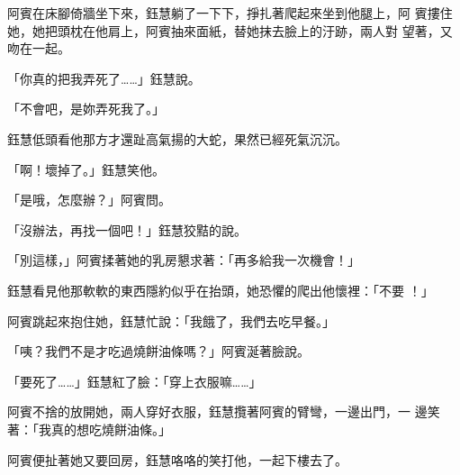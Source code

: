 阿賓在床腳倚牆坐下來，鈺慧躺了一下下，掙扎著爬起來坐到他腿上，阿
賓摟住她，她把頭枕在他肩上，阿賓抽來面紙，替她抹去臉上的汙跡，兩人對
望著，又吻在一起。

「你真的把我弄死了……」鈺慧說。

「不會吧，是妳弄死我了。」

鈺慧低頭看他那方才還趾高氣揚的大蛇，果然已經死氣沉沉。

「啊！壞掉了。」鈺慧笑他。

「是哦，怎麼辦？」阿賓問。

「沒辦法，再找一個吧！」鈺慧狡黠的說。

「別這樣，」阿賓揉著她的乳房懇求著：「再多給我一次機會！」

鈺慧看見他那軟軟的東西隱約似乎在抬頭，她恐懼的爬出他懷裡：「不要
！」

阿賓跳起來抱住她，鈺慧忙說：「我餓了，我們去吃早餐。」

「咦？我們不是才吃過燒餅油條嗎？」阿賓涎著臉說。

「要死了……」鈺慧紅了臉：「穿上衣服嘛……」

阿賓不捨的放開她，兩人穿好衣服，鈺慧攬著阿賓的臂彎，一邊出門，一
邊笑著：「我真的想吃燒餅油條。」

阿賓便扯著她又要回房，鈺慧咯咯的笑打他，一起下樓去了。










